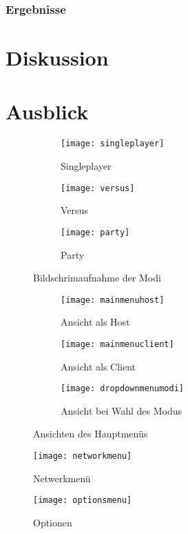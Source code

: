 \subsection{Ergebnisse}


\chapter{Diskussion}
\chapter{Ausblick}

\begin{figure}[b]
	\centering	
	\begin{subfigure}[a]{0.3\linewidth}
		\texttt{[image: singleplayer]}
		\caption{Singleplayer}
		\label{fig:singleplayer}
	\end{subfigure}	
	\begin{subfigure}[a]{0.3\linewidth}
		\texttt{[image: versus]}
		\caption{Versus}
		\label{fig:versus}
	\end{subfigure}
	\begin{subfigure}[a]{0.3\linewidth}
		\texttt{[image: party]}
		\caption{Party}
		\label{fig:party}
	\end{subfigure}	
	\caption{Bildschrimaufnahme der Modi}
    \label{fig:modi}
\end{figure}

\begin{figure}[b]
	\centering
    \begin{subfigure}[a]{0.3\linewidth}
    	\texttt{[image: mainmenuhost]}
    	\caption{Ansicht als Host}
        \label{fig:menuhost}
    \end{subfigure}
    \begin{subfigure}[a]{0.3\linewidth}
    	\texttt{[image: mainmenuclient]}
    	\caption{Ansicht als Client}
        \label{fig:menuclient}
    \end{subfigure}
    \begin{subfigure}[a]{0.3\linewidth}
    	\texttt{[image: dropdownmenumodi]}
    	\caption{Ansicht bei Wahl des Modus}
        \label{fig:menumodi}
    \end{subfigure}
    \caption{Ansichten des Hauptmenüs}
    \label{menu}
\end{figure}

\begin{wrapfigure}{r}{0.3\textwidth}
	\centering
	\texttt{[image: networkmenu]}
    \caption{Netwerkmenü}
   \label{network}
\end{wrapfigure}

\begin{wrapfigure}{r}{0.3\textwidth}
	\centering
    \texttt{[image: optionsmenu]}
    \caption{Optionen}
    \label{option}
\end{wrapfigure}
%


\listoffigures
%


